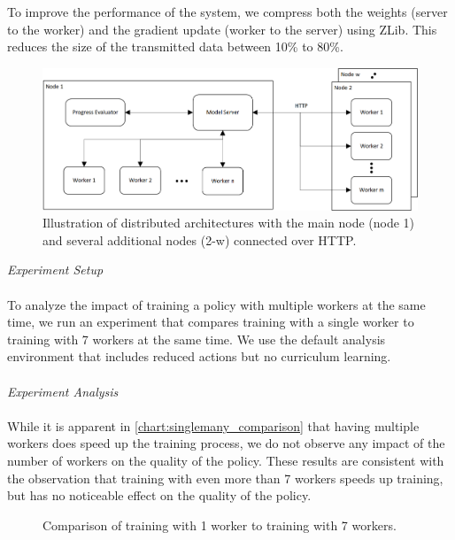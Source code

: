 To improve the performance of the system, we compress both the weights (server to the worker) and the gradient update (worker to the server) using ZLib. This reduces the size of the transmitted data between 10\% to 80\%.
\begin{figure}[H]
	\centering
	\includegraphics[width=400pt]{images/visio/architecture.png}
	\caption{Illustration of distributed architectures with the main node (node 1) and several additional nodes (2-w) connected over HTTP.}
	\label{dist_architecture_img}
\end{figure}
\textit{Experiment Setup}\\\\
To analyze the impact of training a policy with multiple workers at the same time, we run an experiment that compares training with a single worker to training with 7 workers at the same time. We use the default analysis environment that includes reduced actions but no curriculum learning.\\\\
\textit{Experiment Analysis}\\\\
While it is apparent in \autoref{chart:singlemany_comparison} that having multiple workers does speed up the training process, we do not observe any impact of the number of workers on the quality of the policy. These results are consistent with the observation that training with even more than 7 workers speeds up training, but has no noticeable effect on the quality of the policy.
\begin{figure}[H]
	\begin{center}
		
	\end{center}
	\caption{Comparison of training with 1 worker to training with 7 workers.}
	\label{chart:singlemany_comparison}
\end{figure}
